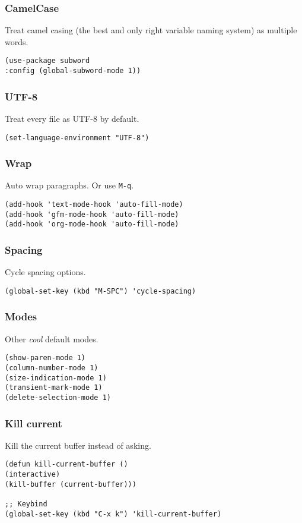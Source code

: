 \documentclass[11pt]{article}
\begin{document}
\subsubsection*{CamelCase}
\label{sec:org1ede3ec}
Treat camel casing (the best and only right variable naming system) as multiple words.
\begin{verbatim}
(use-package subword
:config (global-subword-mode 1))
\end{verbatim}
\subsubsection*{UTF-8}
\label{sec:orgc4a29b3}
Treat every file as UTF-8 by default.
\begin{verbatim}
(set-language-environment "UTF-8")
\end{verbatim}
\subsubsection*{Wrap}
\label{sec:orga04c809}
Auto wrap paragraphs. Or use \texttt{M-q}.
\begin{verbatim}
(add-hook 'text-mode-hook 'auto-fill-mode)
(add-hook 'gfm-mode-hook 'auto-fill-mode)
(add-hook 'org-mode-hook 'auto-fill-mode)
\end{verbatim}
\subsubsection*{Spacing}
\label{sec:org7cf4df6}
Cycle spacing options.
\begin{verbatim}
(global-set-key (kbd "M-SPC") 'cycle-spacing)
\end{verbatim}
\subsubsection*{Modes}
\label{sec:org5220623}
Other \emph{cool} default modes.
\begin{verbatim}
(show-paren-mode 1)
(column-number-mode 1)
(size-indication-mode 1)
(transient-mark-mode 1)
(delete-selection-mode 1)
\end{verbatim}
\subsubsection*{Kill current}
\label{sec:org4fee383}
Kill the current buffer instead of asking.
\begin{verbatim}
(defun kill-current-buffer ()
(interactive)
(kill-buffer (current-buffer)))

;; Keybind
(global-set-key (kbd "C-x k") 'kill-current-buffer)
\end{verbatim}
\end{document}
